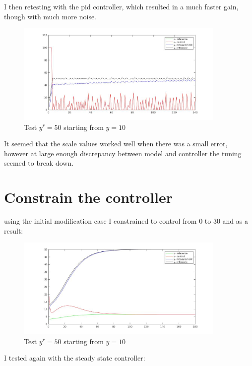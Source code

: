 \documentclass{article}
\begin{document}
I then retesting with the pid controller, which resulted in a much faster gain, though with much more noise.
\begin{figure}[H]
    \centering
    \includegraphics[width=0.9\textwidth]{mpc_heavy_modified_model_pid.jpg}
    \caption{Test $y^r = 50$ starting from $y=10$}
    \label{fig:yr50}
\end{figure}

It seemed that the scale values worked well when there  was a small error, however at large enough discrepancy between model and controller the tuning seemed to break down.

\section{Constrain the controller}

using the initial modification case I constrained to control from 0 to 30 and as a result: 

\begin{figure}[H]
    \centering
    \includegraphics[width=0.9\textwidth]{mpc_modified_model_hH.jpg}
    \caption{Test $y^r = 50$ starting from $y=10$}
    \label{fig:yr50}
\end{figure}

I tested again with the steady state controller:
\end{document}

